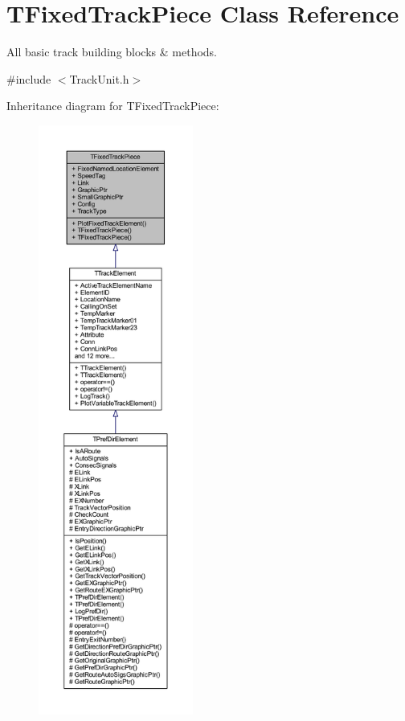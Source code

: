 \hypertarget{class_t_fixed_track_piece}{}\section{T\+Fixed\+Track\+Piece Class Reference}
\label{class_t_fixed_track_piece}


All basic track building blocks \& methods.  




{\ttfamily \#include $<$Track\+Unit.\+h$>$}



Inheritance diagram for T\+Fixed\+Track\+Piece\+:\nopagebreak
\begin{figure}[H]
\begin{center}
\leavevmode
\includegraphics[height=550pt]{class_t_fixed_track_piece__inherit__graph}
\end{center}
\end{figure}



